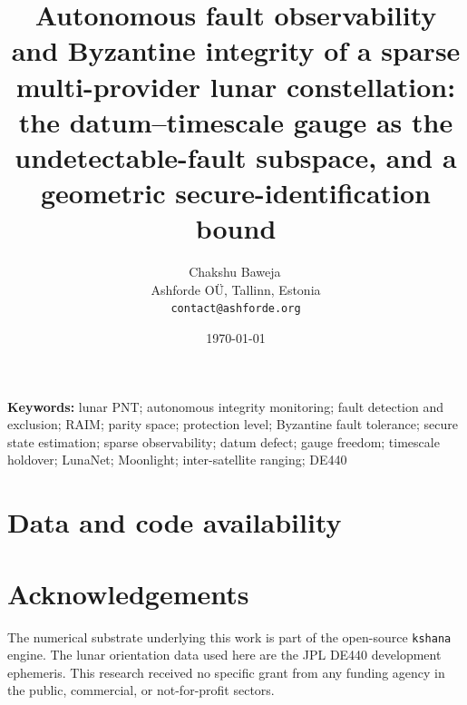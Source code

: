 \documentclass[11pt]{article}
\title{\textbf{Autonomous fault observability and Byzantine integrity of a
sparse multi-provider lunar constellation: the datum--timescale gauge as the
undetectable-fault subspace, and a geometric secure-identification bound}}
\author{Chakshu Baweja\,\orcidlink{0009-0008-2098-0751}\\
\small Ashforde O\"U, Tallinn, Estonia \\
\small \texttt{contact@ashforde.org}}
\date{\today}
\theoremstyle{definition}
\newcommand{\code}[1]{\texttt{#1}}
\begin{document}
\maketitle

\begin{abstract}

\end{abstract}

\noindent\textbf{Keywords:} lunar PNT; autonomous integrity monitoring; fault
detection and exclusion; RAIM; parity space; protection level; Byzantine fault
tolerance; secure state estimation; sparse observability; datum defect; gauge
freedom; timescale holdover; LunaNet; Moonlight; inter-satellite ranging; DE440

\vspace{0.5em}










\section*{Data and code availability}


\section*{Acknowledgements}
The numerical substrate underlying this work is part of the open-source
\code{kshana} engine. The lunar orientation data used here are the JPL DE440
development ephemeris. This research received no specific grant from any funding
agency in the public, commercial, or not-for-profit sectors.




\appendix

\end{document}
